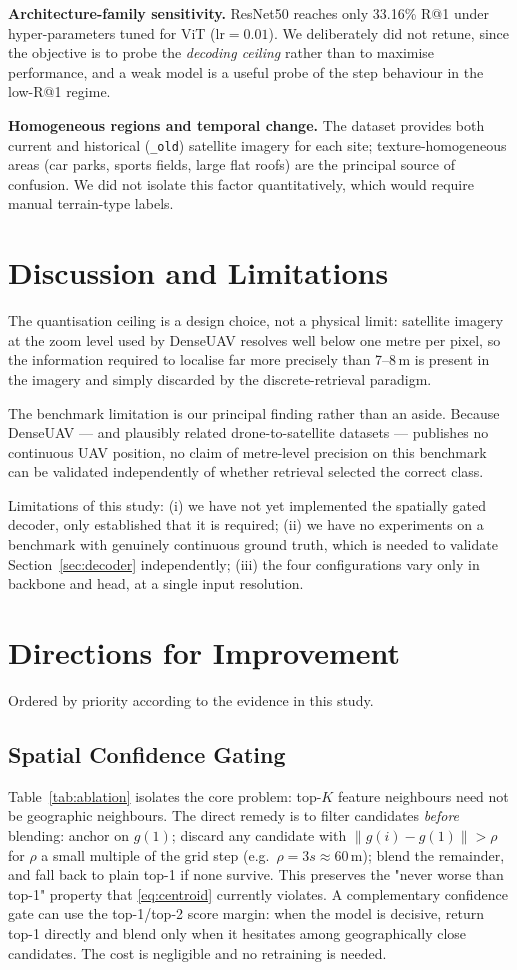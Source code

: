 \documentclass[journal]{IEEEtran}
\begin{document}
\textbf{Architecture-family sensitivity.} ResNet50 reaches only 33.16\% R@1 under
hyper-parameters tuned for ViT ($\mathrm{lr}=0.01$). We deliberately did not retune, since
the objective is to probe the \emph{decoding ceiling} rather than to maximise performance,
and a weak model is a useful probe of the step behaviour in the low-R@1 regime.

\textbf{Homogeneous regions and temporal change.} The dataset provides both current and
historical (\texttt{\_old}) satellite imagery for each site; texture-homogeneous areas
(car parks, sports fields, large flat roofs) are the principal source of confusion. We did
not isolate this factor quantitatively, which would require manual terrain-type labels.

\section{Discussion and Limitations}
The quantisation ceiling is a design choice, not a physical limit: satellite imagery at the
zoom level used by DenseUAV resolves well below one metre per pixel, so the information
required to localise far more precisely than 7--8\,m is present in the imagery and simply
discarded by the discrete-retrieval paradigm.

The benchmark limitation is our principal finding rather than an aside. Because DenseUAV
--- and plausibly related drone-to-satellite datasets --- publishes no continuous UAV
position, no claim of metre-level precision on this benchmark can be validated
independently of whether retrieval selected the correct class.

Limitations of this study: (i) we have not yet implemented the spatially gated decoder,
only established that it is required; (ii) we have no experiments on a benchmark with
genuinely continuous ground truth, which is needed to validate
Section~\ref{sec:decoder} independently; (iii) the four configurations vary only in
backbone and head, at a single input resolution.

\section{Directions for Improvement}
Ordered by priority according to the evidence in this study.

\subsection{Spatial Confidence Gating}
Table~\ref{tab:ablation} isolates the core problem: top-$K$ feature neighbours need not be
geographic neighbours. The direct remedy is to filter candidates \emph{before} blending:
anchor on $g(1)$; discard any candidate with $\lVert g(i)-g(1)\rVert > \rho$ for $\rho$ a
small multiple of the grid step (e.g.\ $\rho = 3s \approx 60$\,m); blend the remainder, and
fall back to plain top-1 if none survive. This preserves the "never worse than top-1"
property that \eqref{eq:centroid} currently violates. A complementary confidence gate can
use the top-1/top-2 score margin: when the model is decisive, return top-1 directly and
blend only when it hesitates among geographically close candidates. The cost is negligible
and no retraining is needed.
\end{document}
